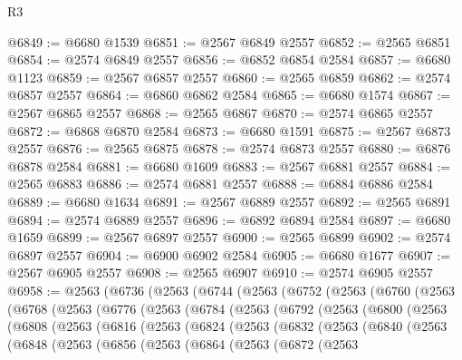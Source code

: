 \begin{lexlean}{R3}
\begin{coremodule}
@6849 := @6680 @1539
@6851 := @2567 @6849 @2557
@6852 := @2565 @6851
@6854 := @2574 @6849 @2557
@6856 := @6852 @6854 @2584
@6857 := @6680 @1123
@6859 := @2567 @6857 @2557
@6860 := @2565 @6859
@6862 := @2574 @6857 @2557
@6864 := @6860 @6862 @2584
@6865 := @6680 @1574
@6867 := @2567 @6865 @2557
@6868 := @2565 @6867
@6870 := @2574 @6865 @2557
@6872 := @6868 @6870 @2584
@6873 := @6680 @1591
@6875 := @2567 @6873 @2557
@6876 := @2565 @6875
@6878 := @2574 @6873 @2557
@6880 := @6876 @6878 @2584
@6881 := @6680 @1609
@6883 := @2567 @6881 @2557
@6884 := @2565 @6883
@6886 := @2574 @6881 @2557
@6888 := @6884 @6886 @2584
@6889 := @6680 @1634
@6891 := @2567 @6889 @2557
@6892 := @2565 @6891
@6894 := @2574 @6889 @2557
@6896 := @6892 @6894 @2584
@6897 := @6680 @1659
@6899 := @2567 @6897 @2557
@6900 := @2565 @6899
@6902 := @2574 @6897 @2557
@6904 := @6900 @6902 @2584
@6905 := @6680 @1677
@6907 := @2567 @6905 @2557
@6908 := @2565 @6907
@6910 := @2574 @6905 @2557
@6958 := @2563
    (@6736
      (@2563
        (@6744
          (@2563
            (@6752
              (@2563
                (@6760
                  (@2563
                    (@6768
                      (@2563
                        (@6776
                          (@2563
                            (@6784
                              (@2563
                                (@6792
                                  (@2563
                                    (@6800
                                      (@2563
                                        (@6808
                                          (@2563
                                            (@6816
                                              (@2563
                                                (@6824
                                                  (@2563
                                                    (@6832
                                                      (@2563
                                                        (@6840
                                                          (@2563
                                                            (@6848
                                                              (@2563
                                                                (@6856
                                                                  (@2563
                                                                    (@6864
                                                                      (@2563
                                                                        (@6872
                                                                          (@2563

\end{coremodule}
\end{lexlean}
